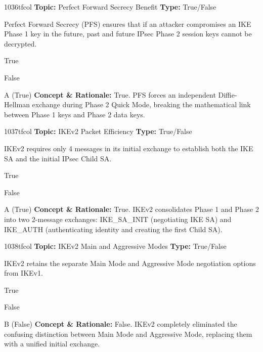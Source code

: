 \begin{qcard}{1036}{tfcol}
\textcolor{darkslate!75}{\small\textbf{Topic:} Perfect Forward Secrecy Benefit \hfill \textbf{Type:} True/False}\vspace{0.4em}\par
Perfect Forward Secrecy (PFS) ensures that if an attacker compromises an IKE Phase 1 key in the future, past and future IPsec Phase 2 session keys cannot be decrypted.
\begin{qoptions}
\item True
\item False
\end{qoptions}
\end{qcard}
\nopagebreak
\begin{explainbox}{A (True)}
\textbf{Concept \& Rationale:} True. PFS forces an independent Diffie-Hellman exchange during Phase 2 Quick Mode, breaking the mathematical link between Phase 1 keys and Phase 2 data keys.
\end{explainbox}

\begin{qcard}{1037}{tfcol}
\textcolor{darkslate!75}{\small\textbf{Topic:} IKEv2 Packet Efficiency \hfill \textbf{Type:} True/False}\vspace{0.4em}\par
IKEv2 requires only 4 messages in its initial exchange to establish both the IKE SA and the initial IPsec Child SA.
\begin{qoptions}
\item True
\item False
\end{qoptions}
\end{qcard}
\nopagebreak
\begin{explainbox}{A (True)}
\textbf{Concept \& Rationale:} True. IKEv2 consolidates Phase 1 and Phase 2 into two 2-message exchanges: IKE\_SA\_INIT (negotiating IKE SA) and IKE\_AUTH (authenticating identity and creating the first Child SA).
\end{explainbox}

\begin{qcard}{1038}{tfcol}
\textcolor{darkslate!75}{\small\textbf{Topic:} IKEv2 Main and Aggressive Modes \hfill \textbf{Type:} True/False}\vspace{0.4em}\par
IKEv2 retains the separate Main Mode and Aggressive Mode negotiation options from IKEv1.
\begin{qoptions}
\item True
\item False
\end{qoptions}
\end{qcard}
\nopagebreak
\begin{explainbox}{B (False)}
\textbf{Concept \& Rationale:} False. IKEv2 completely eliminated the confusing distinction between Main Mode and Aggressive Mode, replacing them with a unified initial exchange.
\end{explainbox}


